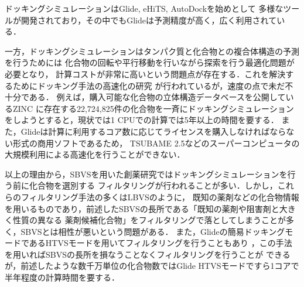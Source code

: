 ドッキングシミュレーションはGlide\cite{Friesner2004}, eHiTS\cite{Zsoldos2007}, AutoDock\cite{Morris2009}を始めとして
多様なツールが開発されており，その中でもGlideは予測精度が高く\cite{Kruger2010}，広く利用されている\cite{Yuriev2013}．

一方，ドッキングシミュレーションはタンパク質と化合物との複合体構造の予測を行うためには
化合物の回転や平行移動を行いながら探索を行う最適化問題が必要となり，
計算コストが非常に高いという問題点が存在する．これを解決するためにドッキング手法の高速化の研究\cite{Kannan2010, McIntosh-Smith2014, Trott2010}
が行われているが，速度の点で未だ不十分である．
例えば，購入可能な化合物の立体構造データベースを公開しているZINC
\cite{Irwin2005}に存在する22,724,825件の化合物を一斉にドッキングシミュレーションをしようとすると，現状では1 CPUでの計算では5年以上の時間を要する．
また，Glideは計算に利用するコア数に応じてライセンスを購入しなければならない形式の商用ソフトであるため，
TSUBAME 2.5などのスーパーコンピュータの大規模利用による高速化を行うことができない．
%

以上の理由から，SBVSを用いた創薬研究ではドッキングシミュレーションを行う前に化合物を選別する
フィルタリングが行われることが多い\cite{Nilakantan1993, Parenti2003}．しかし，これらのフィルタリング手法の多くはLBVSのように，
既知の薬剤などの化合物情報を用いるものであり，前述したSBVSの長所である「既知の薬剤や阻害剤と大きく性質の異なる
薬剤候補化合物」をフィルタリングで落としてしまうことが多く，SBVSとは相性が悪いという問題がある．
また，Glideの簡易ドッキングモードであるHTVSモードを用いてフィルタリングを行うこともあり
\cite{Fujimoto2008}，この手法を用いればSBVSの長所を損なうことなくフィルタリングを行うことが
できるが，前述したような数千万単位の化合物数ではGlide HTVSモードですら1コアで半年程度の計算時間を要する．


